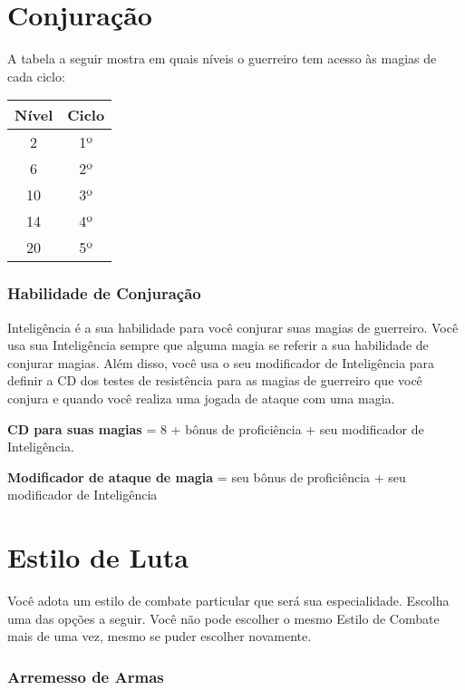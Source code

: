 \documentclass{RPG_Adventure}[2021/10/20]
\begin{document}
\begin{multicols}{2}
\section*{Conjuração}%

A tabela a seguir mostra em quais níveis o guerreiro tem acesso às magias de
cada ciclo:

\begin{center}
\begin{tabular}{|||c||c|||}
    \hline
    \textbf{Nível} & \textbf{Ciclo} \\
    \hline
    2 & 1º \\
    \hline
    6 & 2º \\
    \hline
    10 & 3º \\
    \hline
    14 & 4º \\
    \hline
    20 & 5º \\
    \hline
\end{tabular}
\end{center}

\subsubsection*{Habilidade de Conjuração}%

Inteligência é a sua habilidade para você conjurar suas magias de guerreiro.
Você usa sua Inteligência sempre que alguma magia se referir a sua habilidade de
conjurar magias. Além disso, você usa o seu modificador de Inteligência para
definir a CD dos testes de resistência para as magias de guerreiro que você
conjura e quando você realiza uma jogada de ataque com uma magia.

\begin{center}
\textbf{CD para suas magias} = 8 + bônus de proficiência + seu modificador de
Inteligência. \nl

\textbf{Modificador de ataque de magia} = seu bônus de proficiência + seu
modificador de Inteligência
\end{center}

\section*{Estilo de Luta}%

Você adota um estilo de combate particular que será sua especialidade. Escolha
uma das opções a seguir. Você não pode escolher o mesmo Estilo de Combate mais
de uma vez, mesmo se puder escolher novamente.

\subsubsection{Arremesso de Armas}%


\end{multicols}
\end{document}

